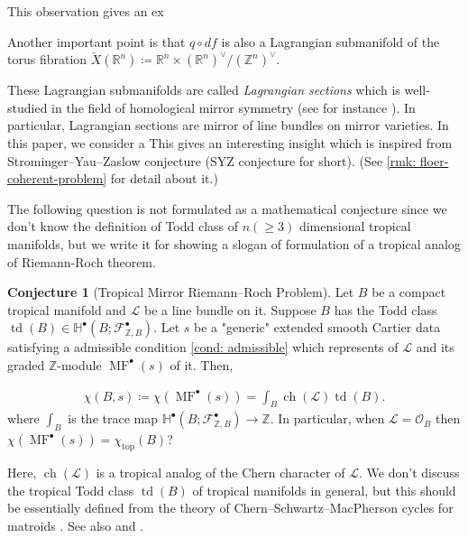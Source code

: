 \documentclass[a4paper,dvipdfmx,reqno,12pt]{amsart}
\theoremstyle{definition}
\newtheorem{Conj}[Thm]{Conjecture}
\newcommand{\deq}{\coloneqq}
\newcommand{\R}{\mathbb{R}}%
\newcommand{\Z}{\mathbb{Z}}%
\newcommand{\mb}[1]{\mathbb{#1}}%
\newcommand{\mcal}[1]{\mathcal{#1}}%
\newcommand{\opn}[1]{\operatorname{#1}}
\numberwithin{equation}{section}
\begin{document}
This observation gives an ex

Another important point is that $q\circ df$ is also a Lagrangian
submanifold of the torus fibration $\check{X}(\R^{n})\deq \R^{n}\times (\R^{n})^{\vee}/(\Z^{n})^{\vee}$.


These Lagrangian submanifolds are called
\emph{Lagrangian sections} 
which is well-studied in the field of homological 
mirror symmetry 
(see for instance \cite{MR1882331}).
In particular, Lagrangian sections are mirror of line bundles on
mirror varieties. 
In this paper, we consider a 
This gives an interesting insight which is inspired from
Strominger--Yau--Zaslow conjecture 
(SYZ conjecture for short).
(See \cref{rmk: floer-coherent-problem} 
for detail about it.)

The following question is not formulated as a mathematical 
conjecture since we don't know the definition of Todd 
class of $n(\geq 3)$ dimensional tropical manifolds,
but we write it for showing a slogan of formulation 
of a tropical analog of Riemann-Roch theorem.

\begin{Conj}[{Tropical Mirror Riemann--Roch Problem}]
Let $B$ be a compact tropical manifold and $\mcal{L}$
be a line bundle on it. Suppose $B$ has the Todd class
$\opn{td}(B) \in \mb{H}^{\bullet}(B;\mcal{F}_{\Z, B}^{\bullet})$.
 Let $s$ be a "generic"
extended smooth Cartier data satisfying a admissible condition 
\cref{cond: admissible} which represents of $\mcal{L}$
and its graded $\Z$-module $\opn{MF}^{\bullet}(s)$
of it. Then,

\begin{align}
\chi(B,s)  \deq \chi(\opn{MF}^{\bullet}(s))=\int_B \opn{ch}(\mcal{L})\opn{td}(B).
\end{align}
where $\int_B$ is the trace map $\mb{H}^{\bullet}(B;\mcal{F}_{\Z, B}^{\bullet})\to \Z$.
In particular, when $\mcal{L}=\mcal{O}_B$ then
$\chi(\opn{MF}^{\bullet}(s))=\chi_{\opn{top}}(B)$?
\end{Conj}

Here, $\opn{ch}(\mcal{L})$ is a tropical analog of 
the Chern character of $\mcal{L}$.
We don't discuss the tropical Todd class
$\opn{td}(B)$ of tropical manifolds in general, 
but this should be essentially defined from the theory of 
Chern--Schwartz--MacPherson cycles for matroids 
\cite[Previous work]{lopezdemedranoChernSchwartzMacPhersonCyclesMatroids2020}.
See also \cite[5.3]{mikhalkinTropicalGeometryIts2006} and
\cite[Definition 3.20]{shawTropicalSurfaces2015a}.
\end{document}
